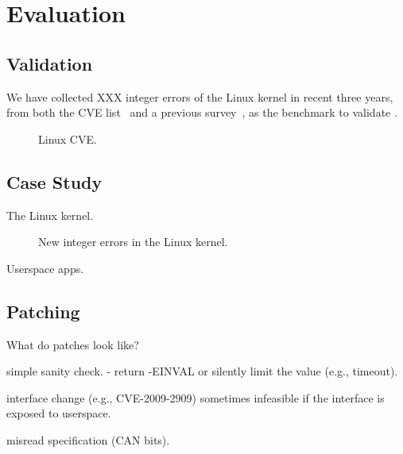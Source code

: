 \section{Evaluation}
\label{s:eval}

\subsection{Validation}

We have collected XXX integer errors of the Linux kernel in recent
three years, from both the CVE list~\cite{cve} and a previous
survey~\cite{chen:kbugs}, as the benchmark to validate \sys.

\newcommand{\ok}{\textcolor{JungleGreen}{\checkmark}\xspace}
\newcommand{\checked}{$\boxtimes$}
\begin{figure*}
\centering
\footnotesize

\caption{Linux CVE.}
\end{figure*}

\subsection{Case Study}

The Linux kernel.

\begin{figure*}
\centering
\footnotesize

\caption{New integer errors in the Linux kernel.}
\end{figure*}

Userspace apps.

\subsection{Patching}

What do patches look like?

simple sanity check.
- return -EINVAL or silently limit the value (e.g., timeout).

interface change (e.g., CVE-2009-2909)
sometimes infeasible if the interface is exposed to userspace.

misread specification (CAN bits).
